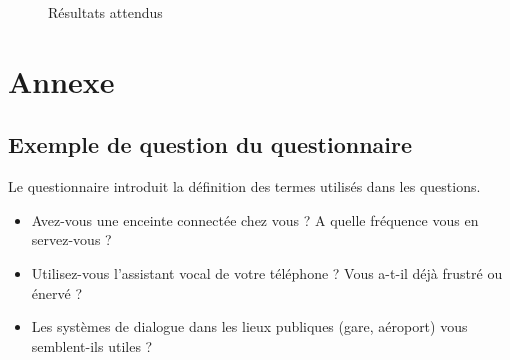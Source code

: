 \documentclass{article}
\begin{document}
\begin{figure}[!htbp]
    \centering
    \qquad
    \qquad
    \caption{Résultats attendus}
    \label{graphiques}
\end{figure}


\section{Annexe}
\subsection{Exemple de question du questionnaire} \hypertarget{questionnaire}{}
Le questionnaire introduit la définition des termes utilisés dans les questions.
\begin{itemize}
    \item Avez-vous une enceinte connectée chez vous ? A quelle fréquence vous en servez-vous ? 
    \item Utilisez-vous l'assistant vocal de votre téléphone ? Vous a-t-il déjà frustré ou énervé ? 
    \item Les systèmes de dialogue dans les lieux publiques (gare, aéroport) vous semblent-ils utiles ? 
\end{itemize}


\end{document}
